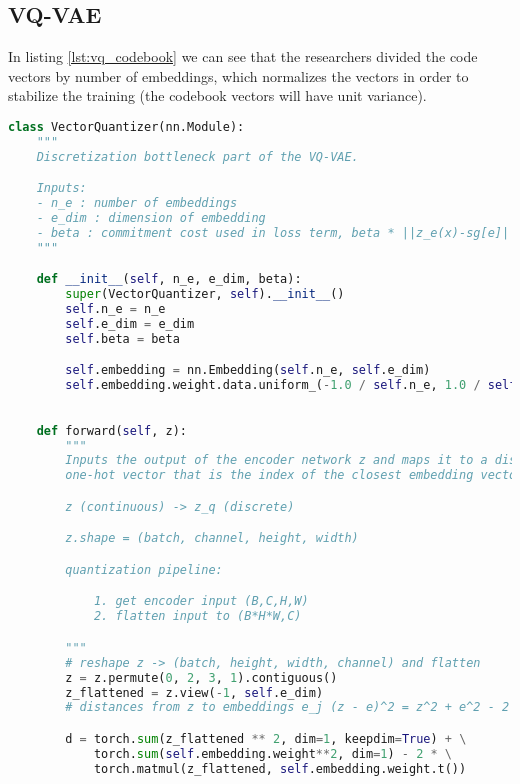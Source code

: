 \subsection{VQ-VAE}

In listing \ref{lst:vq_codebook} we can see that the researchers divided the code vectors by number of embeddings, which normalizes the vectors in order to stabilize the training (the codebook vectors will have unit variance).

\begin{lstlisting}[language=Python, label=lst:vq_codebook, caption=Code of the quantisizer module of VQ-VAE paper. Shows the initialization of the codebook vectors.]
    class VectorQuantizer(nn.Module):
    """
    Discretization bottleneck part of the VQ-VAE.

    Inputs:
    - n_e : number of embeddings
    - e_dim : dimension of embedding
    - beta : commitment cost used in loss term, beta * ||z_e(x)-sg[e]||^2
    """

    def __init__(self, n_e, e_dim, beta):
        super(VectorQuantizer, self).__init__()
        self.n_e = n_e
        self.e_dim = e_dim
        self.beta = beta

        self.embedding = nn.Embedding(self.n_e, self.e_dim)
        self.embedding.weight.data.uniform_(-1.0 / self.n_e, 1.0 / self.n_e)
\end{lstlisting}




\begin{lstlisting}[language=Python, label=lst:vqvae_distance, caption=Euclidean distance calculation in VQ-VAE paper between embedding and codebook vectors $\Vert z-e \Vert$.]

    def forward(self, z):
        """
        Inputs the output of the encoder network z and maps it to a discrete 
        one-hot vector that is the index of the closest embedding vector e_j

        z (continuous) -> z_q (discrete)

        z.shape = (batch, channel, height, width)

        quantization pipeline:

            1. get encoder input (B,C,H,W)
            2. flatten input to (B*H*W,C)

        """
        # reshape z -> (batch, height, width, channel) and flatten
        z = z.permute(0, 2, 3, 1).contiguous()
        z_flattened = z.view(-1, self.e_dim)
        # distances from z to embeddings e_j (z - e)^2 = z^2 + e^2 - 2 e * z

        d = torch.sum(z_flattened ** 2, dim=1, keepdim=True) + \
            torch.sum(self.embedding.weight**2, dim=1) - 2 * \
            torch.matmul(z_flattened, self.embedding.weight.t())
    
\end{lstlisting}


